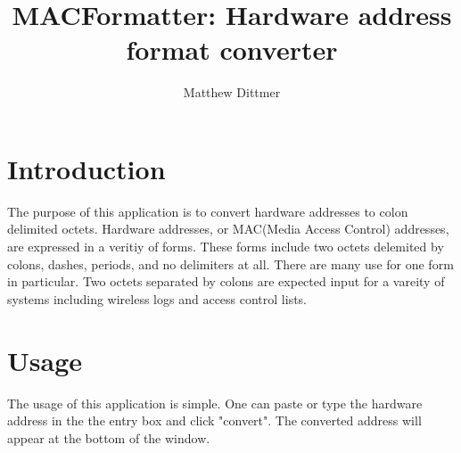 \documentclass[10pt,a4paper,draft]{report}
\author{Matthew Dittmer}
\title{MACFormatter: Hardware address format converter}
\begin{document}
\maketitle
\chapter*{Introduction}

The purpose of this application is to convert hardware addresses to colon delimited octets.  Hardware addresses, or MAC(Media Access Control) addresses, are expressed in a veritiy of forms.  These forms include two octets delemited by colons, dashes, periods, and no delimiters at all.  There are many use for one form in particular.  Two octets separated by colons are expected input for a vareity of systems including wireless logs and access control lists.

\chapter*{Usage}

The usage of this application is simple.  One can paste or type the hardware address in the the entry box and click "convert".  The converted address will appear at the bottom of the window.
\end{document}
